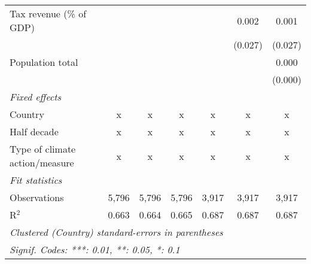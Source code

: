 \begin{tabular}{lcccccc}
   Tax revenue (\% of GDP)                                               &         &                &                &                & 0.002          & 0.001\\   
                                                                         &         &                &                &                & (0.027)        & (0.027)\\   
   Population total                                                      &         &                &                &                &                & 0.000\\   
                                                                         &         &                &                &                &                & (0.000)\\   
   \emph{Fixed effects}\\
   Country                                                               & x       & x              & x              & x              & x              & x\\  
   Half decade                                                           & x       & x              & x              & x              & x              & x\\  
   Type of climate action/measure                                        & x       & x              & x              & x              & x              & x\\  
   \midrule \emph{Fit statistics}\\
   Observations                                                          & 5,796   & 5,796          & 5,796          & 3,917          & 3,917          & 3,917\\  
   R$^2$                                                                 & 0.663   & 0.664          & 0.665          & 0.687          & 0.687          & 0.687\\  
   \midrule
   \multicolumn{7}{l}{\emph{Clustered (Country) standard-errors in parentheses}}\\
   \multicolumn{7}{l}{\emph{Signif. Codes: ***: 0.01, **: 0.05, *: 0.1}}\\
\end{tabular}
\par\endgroup


